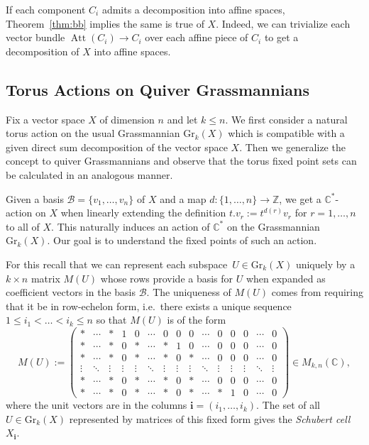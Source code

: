 \documentclass{amsart}
\numberwithin{equation}{section}
\newcommand{\C}{\mathbb{C}}
\newcommand{\CC}{\mathbb{C}}
\newcommand{\ZZ}{\mathbb{Z}}
\newcommand{\bfi}{\mathbf{i}}
\newcommand{\Att}{\operatorname{Att}}
\newcommand{\Gr}{\mathrm{Gr}}
\begin{document}
If each component $C_i$ admits a decomposition into affine spaces, Theorem~\ref{thm:bb} implies the same is true of $X$.
Indeed, we can trivialize each vector bundle $\Att(C_i)\to C_i$ over each affine piece of $C_i$ to get a decomposition of $X$ into affine spaces.


\subsection{Torus Actions on Quiver Grassmannians}
\label{torusaction}
Fix a vector space $X$ of dimension $n$ and let $k\leq n$.
We first consider a natural torus action on the usual Grassmannian $\Gr_k(X)$ which is compatible with a given direct sum decomposition of the vector space $X$.
Then we generalize the concept to quiver Grassmannians and observe that the torus fixed point sets can be calculated in an analogous manner.

Given a basis $\mathcal B=\{v_1,\ldots,v_n\}$ of $X$ and a map $d:\{1,\ldots,n\}\to\ZZ$, we get a $\C^\ast$-action on $X$ when linearly extending the definition $t.v_r:=t^{d(r)}v_r$ for $r=1,\ldots,n$ to all of $X$.
This naturally induces an action of $\C^\ast$ on the Grassmannian $\Gr_k(X)$.
Our goal is to understand the fixed points of such an action.

For this recall that we can represent each subspace~$U\in\Gr_k(X)$ uniquely by a $k\times n$ matrix $M(U)$ whose rows provide a basis for $U$ when expanded as coefficient vectors in the basis $\mathcal B$.
The uniqueness of $M(U)$ comes from requiring that it be in row-echelon form, i.e.\ there exists a unique sequence $1\leq i_1<\ldots<i_k\leq n$ so that $M(U)$ is of the form
\[M(U):=
  \begin{pmatrix}
    \ast&\cdots &\ast &1&0 &\cdots& 0 & 0 & 0 &\cdots&0&0&0&\cdots&0\\
    \ast&\cdots &\ast&0&\ast&\cdots &\ast&1&0&\cdots&0&0&0&\cdots&0\\
    \ast &\cdots&\ast&0&\ast &\cdots&\ast&0&\ast&\cdots&0&0&0&\cdots&0\\[-0.4em]
    \vdots &\ddots&\vdots&\vdots&\vdots &\ddots&\vdots&\vdots&\vdots&\ddots&\vdots&\vdots&\vdots&\ddots&\vdots\\
    \ast&\cdots &\ast&0&\ast&\cdots &\ast&0&\ast&\cdots&0&0&0&\cdots&0\\
    \ast&\cdots &\ast&0&\ast&\cdots &\ast&0&\ast&\cdots&\ast&1&0&\cdots&0
  \end{pmatrix}\in M_{k,n}(\CC),\]
where the unit vectors are in the columns $\bfi=(i_1,\ldots,i_k)$.
The set of all $U\in\Gr_k(X)$ represented by matrices of this fixed form gives the \emph{Schubert cell} $X_\bfi$.
\end{document}
